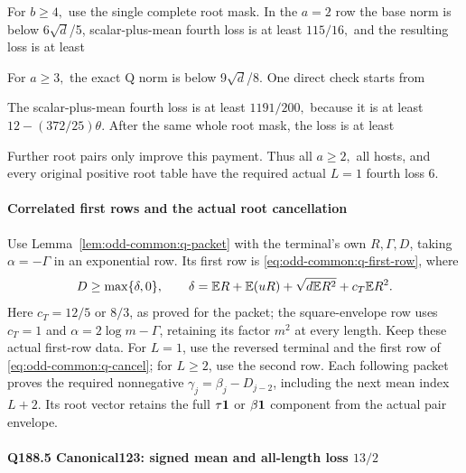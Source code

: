 For \(b\ge 4,\allowbreak \allowbreak  \) use the single complete root mask. In the \(a=2\) row the base norm is below 6\(\sqrt{d}\)/5, scalar-plus-mean fourth loss is at least \(115/16,\allowbreak \) and the resulting loss is at least



For \(a\ge 3,\allowbreak \allowbreak  \) the exact Q norm is below 9\(\sqrt{d}\)/8. One direct check starts from



The scalar-plus-mean fourth loss is at least \(1191/200,\allowbreak \) because it is at least \(12-(372/25)\theta\). After the same whole root mask, the loss is at least



Further root pairs only improve this payment. Thus all \(a\ge 2,\allowbreak \allowbreak  \) all hosts, and every original positive root table have the required actual \(L=1\) fourth loss 6.

\paragraph{Correlated first rows and the actual root cancellation}
Use Lemma~\ref{lem:odd-common:q-packet} with the terminal's own
\(R,\Gamma,D\), taking \(\alpha=-\Gamma\) in an exponential row.
Its first row is
\eqref{eq:odd-common:q-first-row}, where
\[
 D\ge\max\{\delta,0\},\qquad
 \delta=\mathbb E R+\mathbb E(uR)+\sqrt{d\mathbb E R^2}+c_T\mathbb E R^2.
\]
Here \(c_T=12/5\) or \(8/3\), as proved for the packet;
the square-envelope row uses \(c_T=1\) and
\(\alpha=2\log m-\Gamma\), retaining its factor \(m^2\) at every
length. Keep these actual first-row data.
For \(L=1\), use the reversed terminal and the first row of
\eqref{eq:odd-common:q-cancel}; for \(L\ge2\), use the second row.
Each following packet proves the required nonnegative
\(\gamma_j=\beta_j-D_{j-2}\), including the next mean index
\(L+2\). Its root vector retains the full \(\tau\mathbf1\) or
\(\beta\mathbf1\) component from the actual pair envelope.
\paragraph{Q188.5 Canonical123: signed mean and all-length loss \(13/2\)}

